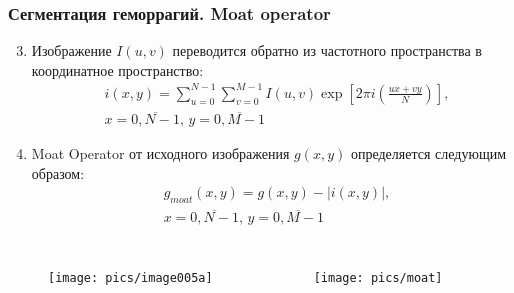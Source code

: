 \documentclass{beamer}
\begin{document}
\begin{frame}
	\frametitle{Сегментация геморрагий. Moat operator}
	
	\scriptsize
	\begin{enumerate}
		\setcounter{enumi}{2}
		\item Изображение $I(u, v)$ переводится обратно из частотного пространства в координатное пространство:
		\begin{equation}
		\begin{split}
		&i(x, y) = \sum\limits_{u=0}^{N - 1} \sum\limits_{v=0}^{M - 1} I(u, v) \exp\left[  2\pi i \left( \frac{ux + vy}{N} \right) \right], \\ \nonumber
		&x =\overline{0, N - 1},\, y = \overline{0, M - 1}
		\end{split}
		\end{equation}
		\item Moat Operator от исходного изображения $g(x, y)$ определяется следующим образом:
		\begin{equation}
		\begin{split}
		&g_{moat}(x, y) = g(x, y) - |i(x, y)|, \\ \nonumber
		&x =\overline{0, N - 1},\, y = \overline{0, M - 1}
		\end{split}
		\end{equation}
	\end{enumerate}
	\vspace*{-0.7cm}
	\begin{columns}
		\begin{figure}[t]
		\centering
		\texttt{[image: pics/image005a]}
		\label{fig:image005a}
		\end{figure}
		
		\begin{figure}[t]
		\centering
		\texttt{[image: pics/moat]}
		\label{fig:moat}
		\end{figure}
	\end{columns}
	\normalsize
	
\end{frame}
\end{document}
